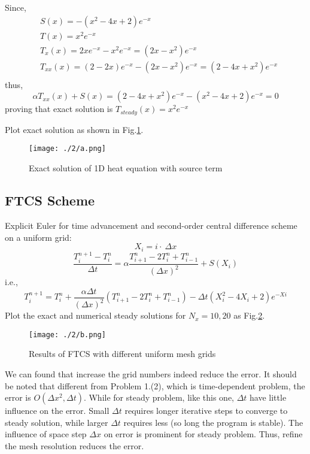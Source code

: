 \documentclass[12pt,a4paper]{article} %
\begin{document}
\begin{CJK}{UTF8}{song}
Since,
\begin{equation}
    \begin{split}
    & S(x)=-(x^{2}-4x+2)e^{-x} \\
    & T(x) = x^{2} e^{-x} \\
    & T_{x}(x) = 2xe^{-x}-x^{2}e^{-x}=(2x-x^{2})e^{-x} \\
    & T_{xx}(x) = (2-2x)e^{-x}-(2x-x^{2})e^{-x} = (2-4x+x^{2})e^{-x} \\
    \end{split}
\end{equation}
thus,
\begin{equation}
\alpha T_{xx}(x)+S(x)=(2-4x+x^{2})e^{-x}-(x^{2}-4x+2)e^{-x} =0
\end{equation}
proving that exact solution is $T_{steady}(x) = x^{2} e^{-x}$

Plot exact solution as shown in Fig.\ref{Fig.2-a}.
\begin{figure}[htbp]
\centering
{
    \texttt{[image: ./2/a.png]}
}
\caption{Exact solution of 1D heat equation with source term} \label{Fig.2-a}
\end{figure}

\subsection{FTCS Scheme}
Explicit Euler for time advancement and second-order central difference scheme on a uniform grid:
\begin{equation}
X_{i}=i\cdot \ \Delta x
\end{equation}
\begin{equation}
\frac{T_{i}^{n+1}-T_{i}^{n}}{\Delta t}=\alpha \frac{T_{i+1}^{n}-2T_{i}^{n}+T_{i-1}^{n}}{(\Delta x)^{2}}+S(X_{i})
\end{equation}
i.e.,
\begin{equation}
T_{i}^{n+1}=T_{i}^{n}+\frac{\alpha \Delta t}{(\Delta x)^{2}}(T_{i+1}^{n}-2T_{i}^{n}+T_{i-1}^{n})-\Delta t (X_{i}^{2}-4X_{i}+2)e^{-X{i}}
\end{equation}
Plot the exact and numerical steady solutions for $N_{x}=10,20$ as Fig.\ref{Fig.2-b}.

\begin{figure}[htbp]
\centering
{
    \texttt{[image: ./2/b.png]}
}
\caption{Results of FTCS with different uniform mesh grids} \label{Fig.2-b}
\end{figure}
We can found that increase the grid numbers indeed reduce the error.
It should be noted that different from Problem 1.(2), which is time-dependent problem, the error is $O(\Delta x^{2},\Delta t)$.
While for steady problem, like this one, $\Delta t$ have little influence on the error.
Small $\Delta t$ requires longer iterative steps to converge to steady solution, while larger $\Delta t$ requires less (so long the program is stable). The influence of space step $\Delta x$ on error is prominent for steady problem. Thus, refine the mesh resolution reduces the error.


\end{CJK}
\end{document}
